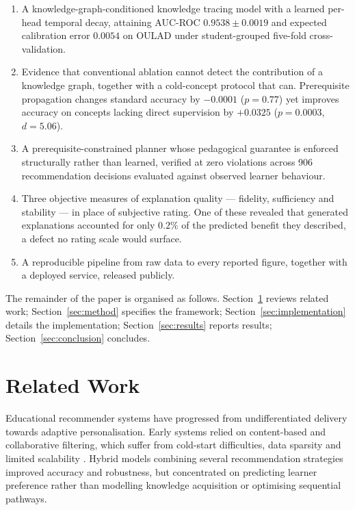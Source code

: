 \documentclass[conference]{IEEEtran}
\begin{document}
\begin{enumerate}
\item A knowledge-graph-conditioned knowledge tracing model with a learned per-head
temporal decay, attaining AUC-ROC $0.9538 \pm 0.0019$ and expected calibration error
$0.0054$ on OULAD under student-grouped five-fold cross-validation.

\item Evidence that conventional ablation cannot detect the contribution of a knowledge
graph, together with a cold-concept protocol that can. Prerequisite propagation changes
standard accuracy by $-0.0001$ ($p = 0.77$) yet improves accuracy on concepts lacking
direct supervision by $+0.0325$ ($p = 0.0003$, $d = 5.06$).

\item A prerequisite-constrained planner whose pedagogical guarantee is enforced
structurally rather than learned, verified at zero violations across 906 recommendation
decisions evaluated against observed learner behaviour.

\item Three objective measures of explanation quality --- fidelity, sufficiency and
stability --- in place of subjective rating. One of these revealed that generated
explanations accounted for only $0.2\%$ of the predicted benefit they described, a defect
no rating scale would surface.

\item A reproducible pipeline from raw data to every reported figure, together with a
deployed service, released publicly.
\end{enumerate}

The remainder of the paper is organised as follows. Section~\ref{sec:related} reviews
related work; Section~\ref{sec:method} specifies the framework;
Section~\ref{sec:implementation} details the implementation;
Section~\ref{sec:results} reports results; Section~\ref{sec:conclusion} concludes.

\section{Related Work}
\label{sec:related}

Educational recommender systems have progressed from undifferentiated delivery towards
adaptive personalisation. Early systems relied on content-based and collaborative
filtering, which suffer from cold-start difficulties, data sparsity and limited
scalability \cite{li2026survey, aher2013combination}. Hybrid models combining several
recommendation strategies improved accuracy and robustness, but concentrated on
predicting learner preference rather than modelling knowledge acquisition or optimising
sequential pathways.
\end{document}
